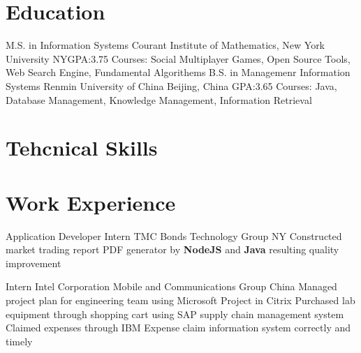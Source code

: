 \documentclass[11pt,a4paper,sans]{moderncv}   %
\begin{document}
\maketitle

\section{Education}
{M.S. in Information Systems}
{Courant Institute of Mathematics, New York University}
{NY}{GPA:3.75}
{Courses: Social Multiplayer Games, Open Source Tools, Web Search Engine, Fundamental Algorithems}
{B.S. in Managemenr Information Systems}
{Renmin University of China}
{Beijing, China}
{GPA:3.65}
{Courses: Java, Database Management, Knowledge Management, Information Retrieval}

\section{Tehcnical Skills}


\section{Work Experience}
\renewcommand{\baselinestretch}{1.0}

{Application Developer Intern}
{TMC Bonds}
{Technology Group}
{NY}
{{Constructed market trading report PDF generator by \textbf{NodeJS} and \textbf{Java} resulting quality improvement}
}

{Intern}
{Intel Corporation}
{Mobile and Communications Group}
{China}
{{Managed project plan for engineering team using Microsoft Project in Citrix}
\newline
{Purchased lab equipment through shopping cart using SAP supply chain management system}
\newline
{Claimed expenses through IBM Expense claim information system correctly and timely}
}
\end{document}
